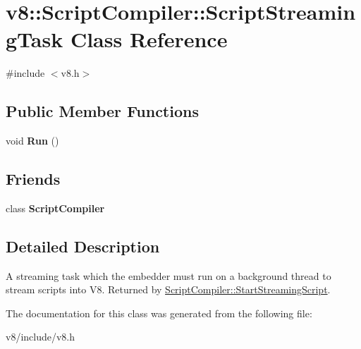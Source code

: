 \hypertarget{classv8_1_1ScriptCompiler_1_1ScriptStreamingTask}{}\section{v8\+:\+:Script\+Compiler\+:\+:Script\+Streaming\+Task Class Reference}
\label{classv8_1_1ScriptCompiler_1_1ScriptStreamingTask}


{\ttfamily \#include $<$v8.\+h$>$}

\subsection*{Public Member Functions}
\begin{DoxyCompactItemize}
\item 
\mbox{\label{classv8_1_1ScriptCompiler_1_1ScriptStreamingTask_ac4900e34a2045112d3ed10db8228165b}} 
void {\bfseries Run} ()
\end{DoxyCompactItemize}
\subsection*{Friends}
\begin{DoxyCompactItemize}
\item 
\mbox{\label{classv8_1_1ScriptCompiler_1_1ScriptStreamingTask_a1cb50af99960b4c11eaee7347e034f51}} 
class {\bfseries Script\+Compiler}
\end{DoxyCompactItemize}


\subsection{Detailed Description}
A streaming task which the embedder must run on a background thread to stream scripts into V8. Returned by \mbox{\hyperlink{classv8_1_1ScriptCompiler_a406bb44ef02d644d94bccd3f7b04f2d4}{Script\+Compiler\+::\+Start\+Streaming\+Script}}. 

The documentation for this class was generated from the following file\+:\begin{DoxyCompactItemize}
\item 
v8/include/v8.\+h\end{DoxyCompactItemize}
